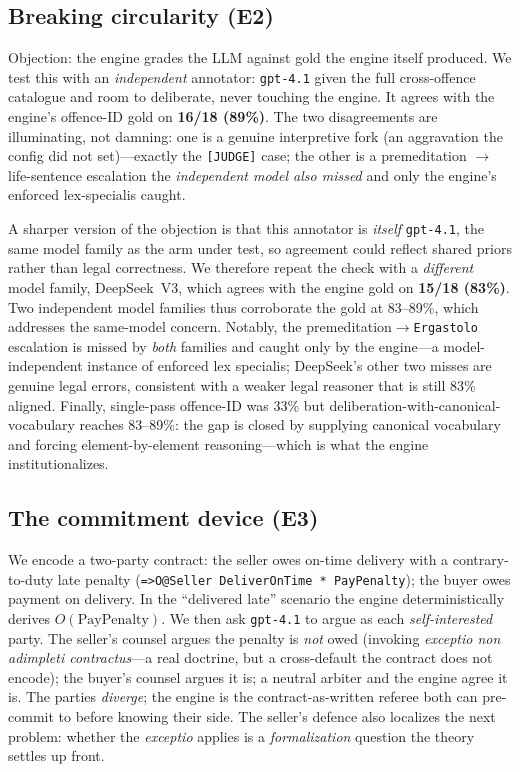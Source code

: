 \documentclass[11pt]{article}
\begin{document}
\subsection{Breaking circularity (E2)}
Objection: the engine grades the LLM against gold the engine itself produced. We
test this with an \emph{independent} annotator: \texttt{gpt-4.1} given the full
cross-offence catalogue and room to deliberate, never touching the engine. It agrees
with the engine's offence-ID gold on \textbf{16/18 (89\%)}. The two disagreements are
illuminating, not damning: one is a genuine interpretive fork (an aggravation the
config did not set)---exactly the \texttt{[JUDGE]} case; the other is a premeditation
$\rightarrow$ life-sentence escalation the \emph{independent model also missed} and
only the engine's enforced lex-specialis caught.

A sharper version of the objection is that this annotator is \emph{itself} \texttt{gpt-4.1},
the same model family as the arm under test, so agreement could reflect shared priors rather
than legal correctness. We therefore repeat the check with a \emph{different} model family,
DeepSeek~V3, which agrees with the engine gold on \textbf{15/18 (83\%)}. Two independent model
families thus corroborate the gold at 83--89\%, which addresses the same-model concern. Notably,
the premeditation$\rightarrow$\texttt{Ergastolo} escalation is missed by \emph{both} families and
caught only by the engine---a model-independent instance of enforced lex specialis; DeepSeek's
other two misses are genuine legal errors, consistent with a weaker legal reasoner that is still
83\% aligned. Finally, single-pass offence-ID was 33\% but deliberation-with-canonical-vocabulary
reaches 83--89\%: the gap is closed by supplying canonical vocabulary and forcing
element-by-element reasoning---which is what the engine institutionalizes.

\subsection{The commitment device (E3)}
We encode a two-party contract: the seller owes on-time delivery with a contrary-to-duty
late penalty (\texttt{=>O@Seller DeliverOnTime * PayPenalty}); the buyer owes payment
on delivery. In the ``delivered late'' scenario the engine deterministically derives
$O(\text{PayPenalty})$. We then ask \texttt{gpt-4.1} to argue as each \emph{self-interested}
party. The seller's counsel argues the penalty is \emph{not} owed (invoking
\emph{exceptio non adimpleti contractus}---a real doctrine, but a cross-default the
contract does not encode); the buyer's counsel argues it is; a neutral arbiter and the
engine agree it is. The parties \emph{diverge}; the engine is the contract-as-written
referee both can pre-commit to before knowing their side. The seller's defence also
localizes the next problem: whether the \emph{exceptio} applies is a \emph{formalization}
question the theory settles up front.
\end{document}

